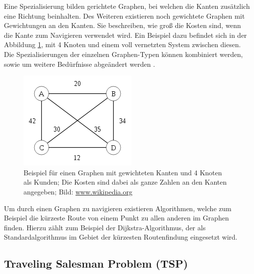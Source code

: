 \noindent
Eine Spezialisierung bilden gerichtete Graphen, bei welchen die Kanten zusätzlich eine Richtung beinhalten. 
Des Weiteren existieren noch gewichtete Graphen mit Gewichtungen an den Kanten. 
Sie beschreiben, wie groß die Kosten sind, wenn die Kante zum Navigieren verwendet wird. 
Ein Beispiel dazu befindet sich in der Abbildung \ref{fig:graph}, mit 4 Knoten und einem voll vernetzten System zwischen diesen. 
Die Spezialisierungen der einzelnen Graphen-Typen können kombiniert werden, sowie um weitere Bedürfnisse abgeändert werden \cite{wurzer2010fallbeispiele}.
\begin{figure}
	\centering
	\includegraphics[scale=0.8]{images/220px-Weighted_K4.png}
	\caption{Beispiel für einen Graphen mit gewichteten Kanten und 4 Knoten als Kunden; Die Kosten sind dabei als ganze Zahlen an den Kanten angegeben; Bild: \url{www.wikipedia.org}}
	\label{fig:graph}
\end{figure}

\noindent
Um durch einen Graphen zu navigieren existieren Algorithmen, welche zum Beispiel die kürzeste Route von einem Punkt zu allen anderen im Graphen finden. 
Hierzu zählt zum Beispiel der Dijkstra-Algorithmus, der als Standardalgorithmus im Gebiet der kürzesten Routenfindung eingesetzt wird. 

\subsection{Traveling Salesman Problem (TSP)}

